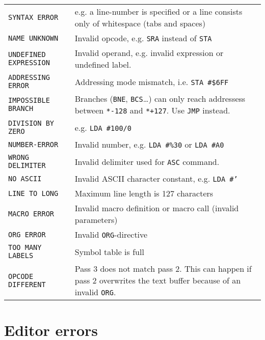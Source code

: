 \documentclass[10pt,a4paper,twoside,final,openright,titlepage]{memoir}
\newcommand{\key}[1]{\keystroke{\tiny #1}}
\begin{document}
\begin{longtable}{p{11em}p{20em}}
\texttt{SYNTAX ERROR} &	e.g. a line-number is specified or a line consists only of whitespace (tabs and spaces) \\

\texttt{NAME UNKNOWN} & 	Invalid opcode, e.g. \texttt{SRA} instead of \texttt{STA} \\

\texttt{UNDEFINED EXPRESSION} & Invalid operand, e.g. invalid expression or undefined label. \\

\texttt{ADDRESSING ERROR} & Addressing mode mismatch, i.e. \texttt{STA \#\$6FF} \\

\texttt{IMPOSSIBLE BRANCH} & Branches (\texttt{BNE}, \texttt{BCS}\dots)
		can only reach addressess between \texttt{*-128} and \texttt{*+127}. Use \texttt{JMP} instead. \\

\texttt{DIVISION BY ZERO} & e.g. \texttt{LDA \#100/0} \\

\texttt{NUMBER-ERROR} &	Invalid number, e.g. \texttt{LDA \#\%30} or \texttt{LDA \#A0} \\

\texttt{WRONG DELIMITER} & Invalid delimiter used for \texttt{ASC} command. \\

\texttt{NO ASCII} & 	Invalid ASCII character constant, e.g. \texttt{LDA \#'}\key{RETURN} \\

\texttt{LINE TO LONG} & 	Maximum line length is 127 characters \\

\texttt{MACRO ERROR} &	Invalid macro definition or macro call (invalid parameters) \\

\texttt{ORG ERROR} &	Invalid \texttt{ORG}-directive \\

\texttt{TOO MANY LABELS} & Symbol table is full \\

\texttt{OPCODE DIFFERENT} & Pass 3 does not match pass 2. This can happen if pass 2 overwrites the text buffer because of an invalid \texttt{ORG}. \\
\end{longtable}
\bigskip

\section{Editor errors}
\end{document}
